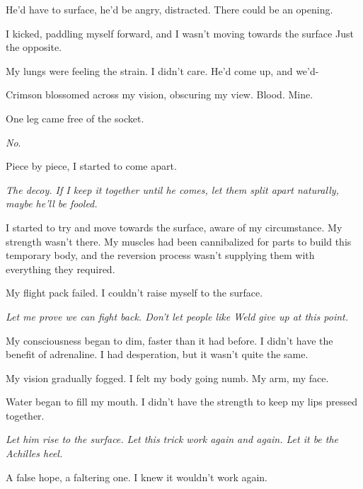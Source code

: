 He'd have to surface, he'd be angry, distracted.  There could be an opening.



I kicked, paddling myself forward, and I wasn't moving towards the surface  Just the opposite.



My lungs were feeling the strain.  I didn't care.  He'd come up, and we'd-



Crimson blossomed across my vision, obscuring my view.  Blood.  Mine.



One leg came free of the socket.



\emph{No}.



Piece by piece, I started to come apart.



\emph{The decoy.  If I keep it together until he comes, let them split apart naturally, maybe he'll be fooled.}



I started to try and move towards the surface, aware of my circumstance.  My strength wasn't there.  My muscles had been cannibalized for parts to build this temporary body, and the reversion process wasn't supplying them with everything they required.



My flight pack failed.  I couldn't raise myself to the surface.



\emph{Let me prove we can fight back.  Don't let people like Weld give up at this point.}



My consciousness began to dim, faster than it had before.  I didn't have the benefit of adrenaline.  I had desperation, but it wasn't quite the same.



My vision gradually fogged.  I felt my body going numb.  My arm, my face.



Water began to fill my mouth.  I didn't have the strength to keep my lips pressed together.



\emph{Let him rise to the surface.  Let this trick work again and again.  Let it be the Achilles heel.}



A false hope, a faltering one.  I knew it wouldn't work again.



